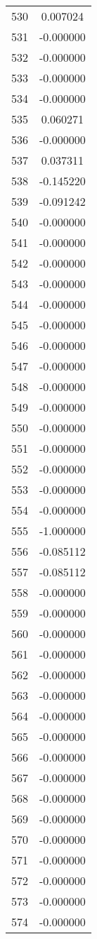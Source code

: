 \documentclass[12pt]{article}
\begin{document}
\begin{longtable}{@{}cc@{}}
530 & 0.007024 \\
531 & -0.000000 \\
532 & -0.000000 \\
533 & -0.000000 \\
534 & -0.000000 \\
535 & 0.060271 \\
536 & -0.000000 \\
537 & 0.037311 \\
538 & -0.145220 \\
539 & -0.091242 \\
540 & -0.000000 \\
541 & -0.000000 \\
542 & -0.000000 \\
543 & -0.000000 \\
544 & -0.000000 \\
545 & -0.000000 \\
546 & -0.000000 \\
547 & -0.000000 \\
548 & -0.000000 \\
549 & -0.000000 \\
550 & -0.000000 \\
551 & -0.000000 \\
552 & -0.000000 \\
553 & -0.000000 \\
554 & -0.000000 \\
555 & -1.000000 \\
556 & -0.085112 \\
557 & -0.085112 \\
558 & -0.000000 \\
559 & -0.000000 \\
560 & -0.000000 \\
561 & -0.000000 \\
562 & -0.000000 \\
563 & -0.000000 \\
564 & -0.000000 \\
565 & -0.000000 \\
566 & -0.000000 \\
567 & -0.000000 \\
568 & -0.000000 \\
569 & -0.000000 \\
570 & -0.000000 \\
571 & -0.000000 \\
572 & -0.000000 \\
573 & -0.000000 \\
574 & -0.000000 \\

\end{longtable}
\end{document}
